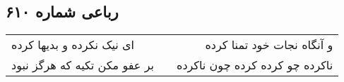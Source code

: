 \begin{center}
\section*{رباعی شماره ۶۱۰}
\label{sec:sh610}
\begin{longtable}{l p{0.5cm} r}
ای نیک نکرده و بدیها کرده
&&
و آنگاه نجات خود تمنا کرده
\\
بر عفو مکن تکیه که هرگز نبود
&&
ناکرده چو کرده کرده چون ناکرده
\\
\end{longtable}
\end{center}
